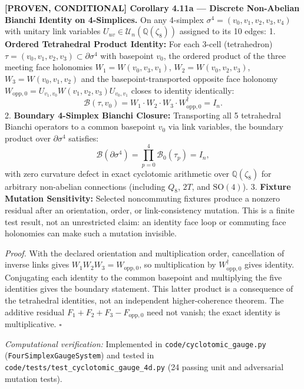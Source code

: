\documentclass[
  english,
  10pt,
  a4paper,
]{article}
\renewenvironment{quote}
  {\begin{leftbar}\small}
  {\end{leftbar}}
\begin{document}
\begin{quote}
\textbf{{[}PROVEN, CONDITIONAL{]} Corollary 4.11a --- Discrete
Non-Abelian Bianchi Identity on 4-Simplices.} On any 4-simplex
\(\sigma^4 = (v_0, v_1, v_2, v_3, v_4)\) with unitary link variables
\(U_{uv} \in \mathcal{U}_n(\mathbb{Q}(\zeta_8))\) assigned to its 10
edges: 1. \textbf{Ordered Tetrahedral Product Identity:} For each 3-cell
(tetrahedron) \(\tau = (v_0, v_1, v_2, v_3) \subset \partial \sigma^4\)
with basepoint \(v_0\), the ordered product of the three meeting face
holonomies \(W_1 = W(v_0, v_3, v_1)\), \(W_2 = W(v_0, v_2, v_3)\),
\(W_3 = W(v_0, v_1, v_2)\) and the basepoint-transported opposite face
holonomy
\(W_{\text{opp}, 0} = U_{v_1, v_0} W(v_1, v_2, v_3) U_{v_0, v_1}\)
closes to identity identically: \[
   \mathcal{B}(\tau, v_0) = W_1 \cdot W_2 \cdot W_3 \cdot W_{\text{opp}, 0}^\dagger = I_n.
   \] 2. \textbf{Boundary 4-Simplex Bianchi Closure:} Transporting all 5
tetrahedral Bianchi operators to a common basepoint \(v_0\) via link
variables, the boundary product over \(\partial \sigma^4\) satisfies: \[
   \mathcal{B}(\partial \sigma^4) = \prod_{p=0}^4 \mathcal{B}_0(\tau_p) = I_n,
   \] with zero curvature defect in exact cyclotomic arithmetic over
\(\mathbb{Q}(\zeta_8)\) for arbitrary non-abelian connections (including
\(Q_8\), \(2T\), and \(\mathrm{SO}(4)\)). 3. \textbf{Fixture Mutation
Sensitivity:} Selected noncommuting fixtures produce a nonzero residual
after an orientation, order, or link-consistency mutation. This is a
finite test result, not an unrestricted claim: an identity face loop or
commuting face holonomies can make such a mutation invisible.

\emph{Proof.} With the declared orientation and multiplication order,
cancellation of inverse links gives \(W_1W_2W_3=W_{\mathrm{opp},0}\), so
multiplication by \(W_{\mathrm{opp},0}^\dagger\) gives identity.
Conjugating each identity to the common basepoint and multiplying the
five identities gives the boundary statement. This latter product is a
consequence of the tetrahedral identities, not an independent
higher-coherence theorem. The additive residual
\(F_1+F_2+F_3-F_{\mathrm{opp},0}\) need not vanish; the exact identity
is multiplicative. \(\square\)
\end{quote}

\emph{Computational verification:} Implemented in
\texttt{code/cyclotomic\_gauge.py} (\texttt{FourSimplexGaugeSystem}) and
tested in \nolinkurl{code/tests/test_cyclotomic_gauge_4d.py} (24 passing
unit and adversarial mutation tests).
\end{document}
